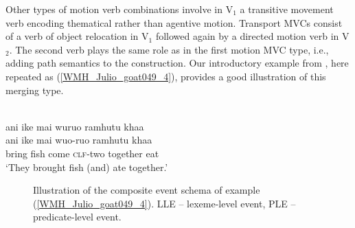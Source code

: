 Other types of motion verb combinations involve in V$_1$ a transitive movement verb encoding thematical rather than agentive motion. Transport MVCs consist of a verb of object relocation in V$_1$ followed again by a directed motion verb in V$_2$. The second verb plays the same role as in the first motion MVC type, i.e., adding path semantics to the construction. Our introductory example from , here repeated as (\ref{WMH_Julio_goat049_4}), provides a good illustration of this merging type.

\ea \label{WMH_Julio_goat049_4}
\\
\glll ani ike mai wuruo ramhutu khaa \\
ani ike mai wuo-ruo ramhutu khaa \\
bring fish come \textsc{clf}-two together eat\\
\glft `They brought fish (and) ate together.' \\ 
\z

\begin{figure}
\caption[Event schema illustration of example (\ref{WMH_Julio_goat049_4})]{Illustration of the composite event schema of example (\ref{WMH_Julio_goat049_4}). LLE -- lexeme-level event, PLE -- predicate-level event.}
\label{figure:eventschema_WP2}
\end{figure}


